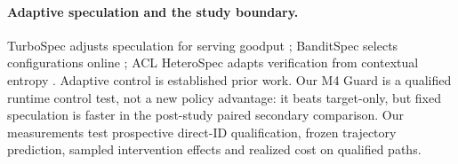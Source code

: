 \paragraph{Adaptive speculation and the study boundary.}
TurboSpec adjusts speculation for serving goodput \citep{turbospec}; BanditSpec selects configurations online \citep{banditspec}; ACL HeteroSpec adapts verification from contextual entropy \citep{aclheterospec}. Adaptive control is established prior work. Our M4 Guard is a qualified runtime control test, not a new policy advantage: it beats target-only, but fixed speculation is faster in the post-study paired secondary comparison. Our measurements test prospective direct-ID qualification, frozen trajectory prediction, sampled intervention effects and realized cost on qualified paths.
